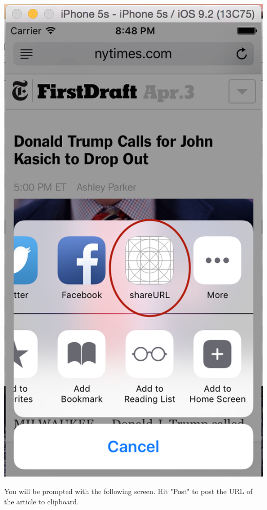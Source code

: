 \documentclass[11pt, margin=1in]{article}
\begin{document}
\begin{center}
\includegraphics[scale=0.5]{11.jpg}
\end{center}

You will be prompted with the following screen.  Hit "Post" to post the URL of the article to clipboard.
\end{document}
